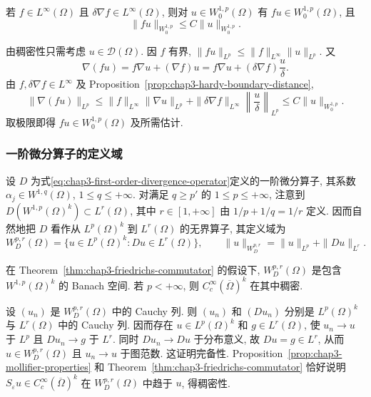 \begin{Corollary}
\label{cor:chap3-hardy-multiplier}
若 $f\in L^\infty(\Omega)$ 且 $\delta\nabla f\in L^\infty(\Omega)$, 则对 $u\in W_0^{1,p}(\Omega)$ 有 $fu\in W_0^{1,p}(\Omega)$, 且
\[
 \|fu\|_{W_0^{1,p}}\leq C\|u\|_{W_0^{1,p}}.
\]
\end{Corollary}

\begin{Proof}
由稠密性只需考虑 $u\in\mathcal D(\Omega)$. 因 $f$ 有界, $\|fu\|_{L^p}\leq\|f\|_{L^\infty}\|u\|_{L^p}$. 又
\[
 \nabla(fu)=f\nabla u+(\nabla f)u
 =f\nabla u+(\delta\nabla f)\frac u\delta.
\]
由 $f,\delta\nabla f\in L^\infty$ 及 Proposition~\ref{prop:chap3-hardy-boundary-distance},
\[
 \|\nabla(fu)\|_{L^p}
 \leq\|f\|_{L^\infty}\|\nabla u\|_{L^p}
 +\|\delta\nabla f\|_{L^\infty}\left\|\frac u\delta\right\|_{L^p}
 \leq C\|u\|_{W_0^{1,p}}.
\]
取极限即得 $fu\in W_0^{1,p}(\Omega)$ 及所需估计.
\end{Proof}

\subsubsection{一阶微分算子的定义域}
\label{subsec:chap3-first-order-operator-domains}

设 $D$ 为式\eqref{eq:chap3-first-order-divergence-operator}定义的一阶微分算子, 其系数 $\alpha_j\in W^{1,q}(\Omega)$, $1\leq q\leq+\infty$. 对满足 $q\geq p'$ 的 $1\leq p\leq+\infty$, 注意到 $D(W^{1,p}(\Omega)^k)\subset L^r(\Omega)$, 其中 $r\in[1,+\infty]$ 由 $1/p+1/q=1/r$ 定义. 因而自然地把 $D$ 看作从 $L^p(\Omega)^k$ 到 $L^r(\Omega)$ 的无界算子, 其定义域为
\[
 W_D^{p,r}(\Omega)=\{u\in L^p(\Omega)^k:Du\in L^r(\Omega)\},
 \qquad\|u\|_{W_D^{p,r}}=\|u\|_{L^p}+\|Du\|_{L^r}.
\]

\begin{Theorem}
\label{thm:chap3-graph-space-density}
在 Theorem~\ref{thm:chap3-friedrichs-commutator} 的假设下, $W_D^{p,r}(\Omega)$ 是包含 $W^{1,p}(\Omega)^k$ 的 Banach 空间. 若 $p<+\infty$, 则 $C_c^\infty(\overline\Omega)^k$ 在其中稠密.
\end{Theorem}

\begin{Proof}
设 $(u_n)$ 是 $W_D^{p,r}(\Omega)$ 中的 Cauchy 列. 则 $(u_n)$ 和 $(Du_n)$ 分别是 $L^p(\Omega)^k$ 与 $L^r(\Omega)$ 中的 Cauchy 列. 因而存在 $u\in L^p(\Omega)^k$ 和 $g\in L^r(\Omega)$, 使 $u_n\to u$ 于 $L^p$ 且 $Du_n\to g$ 于 $L^r$. 同时 $Du_n\to Du$ 于分布意义, 故 $Du=g\in L^r$, 从而 $u\in W_D^{p,r}(\Omega)$ 且 $u_n\to u$ 于图范数. 这证明完备性. Proposition~\ref{prop:chap3-mollifier-properties} 和 Theorem~\ref{thm:chap3-friedrichs-commutator} 恰好说明 $S_\varepsilon u\in C_c^\infty(\overline\Omega)^k$ 在 $W_D^{p,r}(\Omega)$ 中趋于 $u$, 得稠密性.
\end{Proof}

